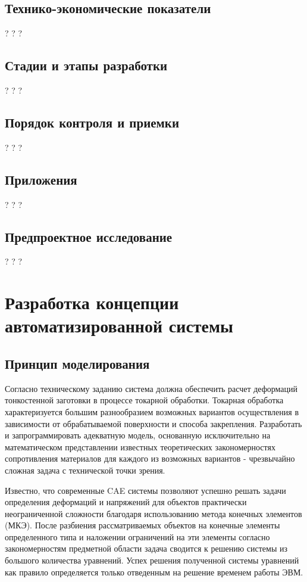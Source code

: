 \documentclass[14pt,oneside,final]{extreport}
\begin{document}
		\section{Технико-экономические показатели}
	    ? ? ?
		\section{Стадии и этапы разработки}
	    ? ? ?
	\section{Порядок контроля и приемки}
	    ? ? ?
		\section{Приложения}
	    ? ? ?
		\section{Предпроектное исследование}
	    ? ? ?
	\chapter{Разработка концепции автоматизированной системы}
	\section{Принцип моделирования}
	Согласно техническому заданию система должна обеспечить расчет деформаций тонкостенной заготовки в процессе токарной обработки. Токарная обработка характеризуется большим разнообразием возможных вариантов осуществления в зависимости от обрабатываемой поверхности и способа закрепления. Разработать и запрограммировать адекватную модель, основанную исключительно на математическом представлении известных теоретических закономерностях сопротивления материалов для каждого из возможных вариантов - чрезвычайно сложная задача с технической точки зрения. 
	
	Известно, что современные CAE системы позволяют успешно решать задачи определения деформаций и напряжений для объектов практически неограниченной сложности благодаря использованию метода конечных элементов (МКЭ). После разбиения рассматриваемых объектов на конечные элементы определенного типа и наложении ограничений на эти элементы согласно закономерностям предметной области задача сводится к решению системы из большого количества уравнений. Успех решения полученной системы уравнений как правило определяется только отведенным на решение временем работы ЭВМ. 
	
\end{document}
